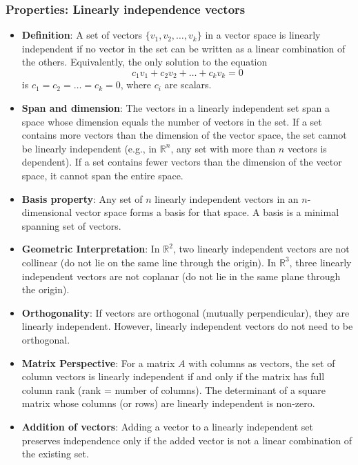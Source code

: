 \documentclass{report}
\begin{document}
    \subsubsection{Properties: Linearly independence vectors}
    \begin{itemize}
        \item \textbf{Definition}: A set of vectors $\{v_1, v_2, \dots, v_k\}$ in a vector space is linearly independent if no vector in the set can be written as a linear combination of the others.
        \bigbreak \noindent 
        Equivalently, the only solution to the equation
        \[
            c_1 v_1 + c_2 v_2 + \dots + c_k v_k = 0
        \]
        is $c_1 = c_2 = \dots = c_k = 0$, where $c_i$ are scalars.
    \item \textbf{Span and dimension}:
        The vectors in a linearly independent set span a space whose dimension equals the number of vectors in the set.
        \bigbreak \noindent 
        If a set contains more vectors than the dimension of the vector space, the set cannot be linearly independent (e.g., in $\mathbb{R}^n$, any set with more than $n$ vectors is dependent).
        \bigbreak \noindent 
        If a set contains fewer vectors than the dimension of the vector space, it cannot span the entire space.
    \item \textbf{Basis property}: Any set of $n$ linearly independent vectors in an $n$-dimensional vector space forms a basis for that space. A basis is a minimal spanning set of vectors.
    \item \textbf{Geometric Interpretation}:
        In $\mathbb{R}^{2}$, two linearly independent vectors are not collinear (do not lie on the same line through the origin).
        \bigbreak \noindent 
        In $\mathbb{R}^{3}$, three linearly independent vectors are not coplanar (do not lie in the same plane through the origin).
    \item \textbf{Orthogonality}: If vectors are orthogonal (mutually perpendicular), they are linearly independent.
        \bigbreak \noindent 
        However, linearly independent vectors do not need to be orthogonal.
    \item \textbf{Matrix Perspective}:
        For a matrix $A$ with columns as vectors, the set of column vectors is linearly independent if and only if the matrix has full column rank (rank = number of columns).
        \bigbreak \noindent 
        The determinant of a square matrix whose columns (or rows) are linearly independent is non-zero.
    \item \textbf{Addition of vectors}: Adding a vector to a linearly independent set preserves independence only if the added vector is not a linear combination of the existing set.

\end{itemize}
\end{document}
